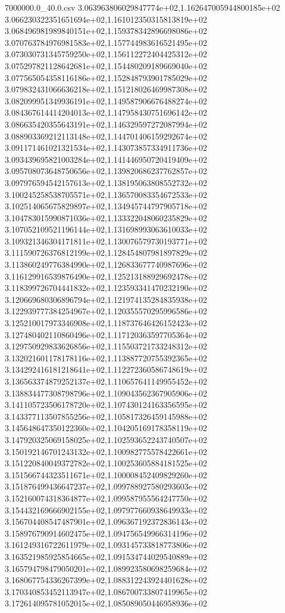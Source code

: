 \begin{filecontents*}{7000000.0_40.0.csv}
3.063963806029847774e+02,1.162647005944800185e+02
3.066230322351651694e+02,1.161012350315813819e+02
3.068496981989840151e+02,1.159378342896698086e+02
3.070763784976981583e+02,1.157744983616521495e+02
3.073030731345759250e+02,1.156112272404425312e+02
3.075297821128642681e+02,1.154480209189669040e+02
3.077565054358116186e+02,1.152848793901785029e+02
3.079832431066636218e+02,1.151218026469987308e+02
3.082099951349936191e+02,1.149587906676488274e+02
3.084367614414204013e+02,1.147958430751696142e+02
3.086635420355643191e+02,1.146329597272087994e+02
3.088903369212113148e+02,1.144701406159292674e+02
3.091171461021321534e+02,1.143073857334911736e+02
3.093439695821003284e+02,1.141446950720419409e+02
3.095708073648750656e+02,1.139820686237762857e+02
3.097976594542157613e+02,1.138195063808552732e+02
3.100245258538705571e+02,1.136570083354672533e+02
3.102514065675829897e+02,1.134945744797905718e+02
3.104783015990871036e+02,1.133322048060235829e+02
3.107052109521196144e+02,1.131698993063610033e+02
3.109321346304171811e+02,1.130076579730193771e+02
3.111590726376812199e+02,1.128454807981897829e+02
3.113860249776384990e+02,1.126833677740987696e+02
3.116129916539876490e+02,1.125213188929692478e+02
3.118399726704441832e+02,1.123593341470232190e+02
3.120669680306896794e+02,1.121974135284835938e+02
3.122939777384254967e+02,1.120355570295996586e+02
3.125210017973346908e+02,1.118737646426152423e+02
3.127480402110860496e+02,1.117120363597705364e+02
3.129750929833626856e+02,1.115503721733248312e+02
3.132021601178178116e+02,1.113887720755392365e+02
3.134292416181218641e+02,1.112272360586748619e+02
3.136563374879252137e+02,1.110657641149955452e+02
3.138834477308798796e+02,1.109043562367905906e+02
3.141105723506178720e+02,1.107430124163356595e+02
3.143377113507855256e+02,1.105817326459145988e+02
3.145648647350122360e+02,1.104205169178358119e+02
3.147920325069158025e+02,1.102593652243740507e+02
3.150192146701243132e+02,1.100982775578422661e+02
3.151220840049372782e+02,1.100253605884181525e+02
3.151566744323511671e+02,1.100008452409829260e+02
3.151876499436647237e+02,1.099788927580293603e+02
3.152160074318364877e+02,1.099587955564247750e+02
3.154432169666902155e+02,1.097977660938649933e+02
3.156704408547487901e+02,1.096367192372836143e+02
3.158976790914602475e+02,1.094756549966314196e+02
3.161249316722611979e+02,1.093145733818773806e+02
3.163521985925854665e+02,1.091534744029540889e+02
3.165794798479050201e+02,1.089923580698259684e+02
3.168067754336267399e+02,1.088312243924401628e+02
3.170340853452113947e+02,1.086700733807419965e+02
3.172614095781052015e+02,1.085089050446958936e+02

\end{filecontents*}
